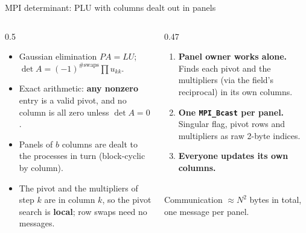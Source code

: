 \documentclass[aspectratio=169,11pt]{beamer}
\begin{document}
\begin{frame}{MPI determinant: PLU with columns dealt out in panels}
  \begin{columns}[T]
    \begin{column}{0.5\textwidth}
      \begin{itemize}\small
        \item Gaussian elimination $PA = LU$; \;
              $\det A = (-1)^{\#\text{swaps}}\prod u_{kk}$.
        \item Exact arithmetic: \textbf{any nonzero} entry is a valid pivot,
              and no column is all zero unless $\det A = 0$.
        \item Panels of $b$ columns are dealt to the processes in turn
              (block-cyclic by column).
        \item The pivot and the multipliers of step $k$ are in column $k$, so the
              pivot search is \textbf{local}; row swaps need no messages.
      \end{itemize}
    \end{column}
    \begin{column}{0.47\textwidth}
      \begin{enumerate}\small
        \item[\textbf{1}] \textbf{Panel owner works alone.} Finds each pivot and the
              multipliers (via the field's reciprocal) in its own columns.
        \item[\textbf{2}] \textbf{One \texttt{MPI\_Bcast} per panel.} Singular flag,
              pivot rows and multipliers as raw 2-byte indices.
        \item[\textbf{3}] \textbf{Everyone updates its own columns.}
      \end{enumerate}
      \vspace{0.4em}
      \\[0.3em]
      {\scriptsize Communication $\approx N^2$ bytes in total, one message per panel.}
    \end{column}
  \end{columns}
\end{frame}
\end{document}
